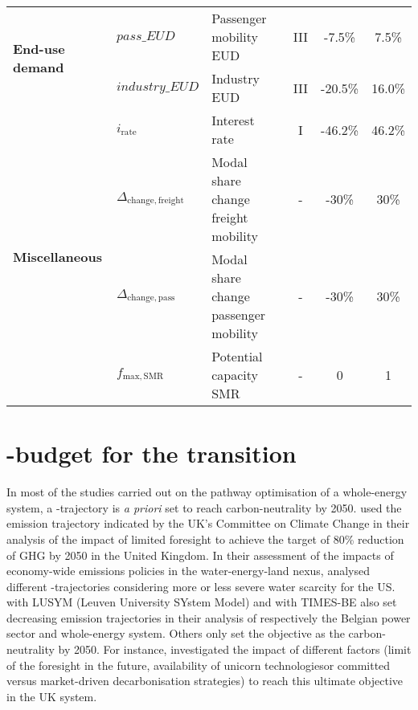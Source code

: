 \begin{table}[htbp!]
\begin{minipage}{\linewidth}
{\begin{tabular}{l l l c c c}
\multirow{2}{*}{\textbf{End-use demand}} & $pass\_EUD$ & Passenger mobility EUD & III & -7.5\% & 7.5\% \\
& $industry\_EUD$ & Industry EUD & III & -20.5\% & 16.0\% \\
\midrule

\multirow{4}{*}{\textbf{Miscellaneous}} &$i_{\mathrm{rate}}$  & Interest rate & I & -46.2\% & 46.2\% \\
& $\Delta_{\mathrm{change,freight}}$ & Modal share change freight mobility & - & -30\% & 30\% \\
& $\Delta_{\mathrm{change,pass}}$ & Modal share change passenger mobility & - & -30\% & 30\% \\
& $f_{\mathrm{max,SMR}}$ & Potential capacity \gls{SMR} & - & 0 & 1 \\

\bottomrule							

\end{tabular}}
\end{minipage}
\end{table}

\section{-budget for the transition}
\label{sec:cs:CO2-budget}
In most of the studies carried out on the pathway optimisation of a whole-energy system, a -trajectory is \textit{a priori} set to reach carbon-neutrality by 2050. \citet{nerini2017myopic} used the emission trajectory indicated by the UK's Committee on Climate Change in their analysis of the impact of limited foresight to achieve the target of 80\% reduction of \gls{GHG} by 2050 in the United Kingdom. In their assessment of the impacts of economy-wide emissions policies in the water-energy-land nexus, \citet{licandeo2023assessing} analysed different -trajectories considering more or less severe water scarcity for the US. \citet{poncelet2016myopic} with LUSYM (Leuven University SYstem Model) and \citet{PATHS2050} with TIMES-BE also set decreasing emission trajectories in their analysis of respectively the Belgian power sector and whole-energy system.  Others only set the objective as the carbon-neutrality by 2050. For instance, \citet{heuberger2018impact} investigated the impact of different factors (\eg limit of the foresight in the future, availability of \og unicorn technologies\fg or committed versus market-driven decarbonisation strategies) to reach this ultimate objective in the UK system.\\

